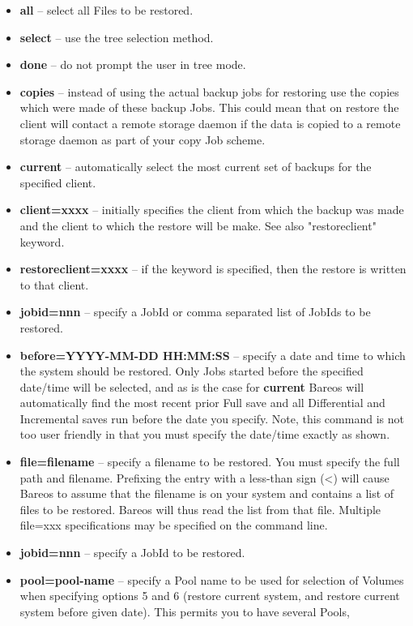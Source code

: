 \begin{itemize}
\item {\bf all} -- select all Files to be restored.
\item {\bf select} -- use the tree selection method.
\item {\bf done} -- do not prompt the user in tree mode.
\item {\bf copies} -- instead of using the actual backup jobs for restoring
   use the copies which were made of these backup Jobs. This could mean that
   on restore the client will contact a remote storage daemon if the data is
   copied to a remote storage daemon as part of your copy Job scheme.
\item {\bf current} -- automatically select the most current set of  backups
   for the specified client.
\item {\bf client=xxxx} -- initially specifies the client from which the
   backup was made and the client to which the restore will be make.  See also
   "restoreclient" keyword.
\item {\bf restoreclient=xxxx} -- if the keyword is specified, then the
   restore is written to that client.
\item {\bf jobid=nnn} -- specify a JobId or comma separated list of  JobIds to
   be restored.
\item {\bf before=YYYY-MM-DD HH:MM:SS} -- specify a date and time to  which
   the system should be restored. Only Jobs started before  the specified
   date/time will be selected, and as is the case  for {\bf current} Bareos will
   automatically find the most  recent prior Full save and all Differential and
   Incremental  saves run before the date you specify. Note, this command is  not
   too user friendly in that you must specify the date/time  exactly as shown.
\item {\bf file=filename} -- specify a filename to be restored. You  must
   specify the full path and filename. Prefixing the entry  with a less-than
   sign
   ({\textless}) will cause Bareos to assume that the  filename is on your system and
   contains a list of files to be  restored. Bareos will thus read the list from
   that file. Multiple  file=xxx specifications may be specified on the command
   line.
\item {\bf jobid=nnn} -- specify a JobId to be restored.
\item {\bf pool=pool-name} -- specify a Pool name to be used for selection  of
   Volumes when specifying options 5 and 6 (restore current system,  and restore
   current system before given date). This permits you to  have several Pools,

\end{itemize}
